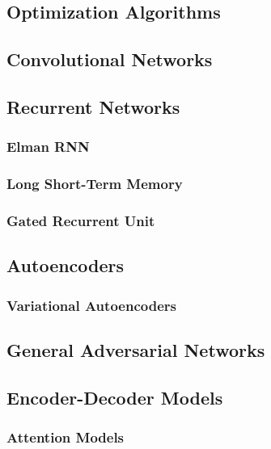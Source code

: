 \documentclass[twoside,twocolumn]{article}
\begin{document}
\subsection{Optimization Algorithms}
\subsection{Convolutional Networks}
\subsection{Recurrent Networks}
\subsubsection{Elman RNN}
\subsubsection{Long Short-Term Memory}
\subsubsection{Gated Recurrent Unit}
\subsection{Autoencoders}
\subsubsection{Variational Autoencoders}
\subsection{General Adversarial Networks}
\subsection{Encoder-Decoder Models}
\subsubsection{Attention Models}



% 
% 

\end{document}
